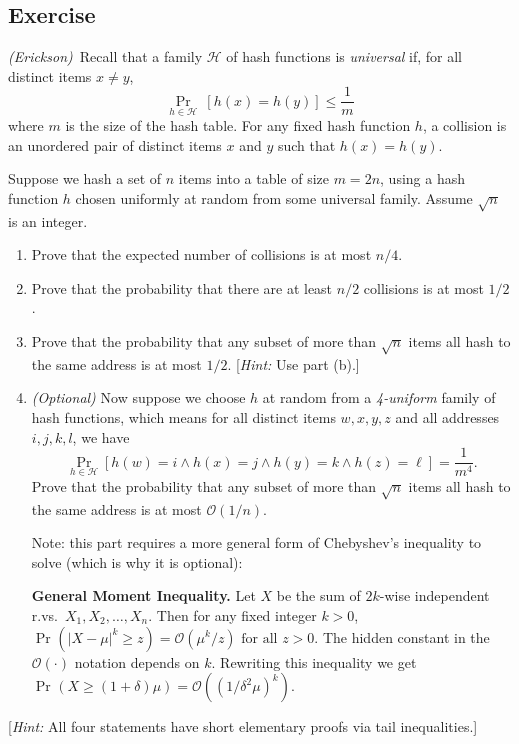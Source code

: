 \documentclass[14pt]{extreport}
\newcounter{counter}
\newcommand{\Exercise}{Exercise \stepcounter{counter}\thecounter}
\DeclareMathOperator*{\oldPr}{Pr}
\renewcommand{\Pr}[2][]{\operatorname{Pr}_{#1}\left(#2\right)}
\begin{document}
\subsection*{\Exercise}
    \textit{(Erickson)}\ Recall that a family \(\mathcal{H}\) of hash functions is \textit{universal} if, for all distinct items \( x \neq y \), $$ \oldPr_{h\in\mathcal{H}}\ [h(x)=h(y)] \leq \frac{1}{m}$$ where \( m \) is the size of the hash table. For any fixed hash function \( h \), a collision is an unordered pair of distinct items \( x \) and \( y \) such that \( h(x)=h(y) \).

    \vspace{3mm}
    Suppose we hash a set of \( n \) items into a table of size \( m = 2n \), using a hash function \( h \) chosen uniformly at random from some universal family. Assume \( \sqrt{n} \) is an integer.
    \begin{enumerate}
        \item Prove that the expected number of collisions is at most \( n/4 \).
        \item  Prove that the probability that there are at least \( n/2 \) collisions is at most \( 1/2 \).
        \item  Prove that the probability that any subset of more than \( \sqrt{n} \) items all hash to the same address is at most \( 1/2 \). [\textit{Hint:} Use part (b).]
        \item \textit{(Optional)} Now suppose we choose \( h \) at random from a \textit{4-uniform} family of hash functions, which means for all distinct items \( w, x, y, z \) and all addresses \( i, j, k, l \), we have \[ \oldPr_{h\in\mathcal{H}}\left[h(w) = i \wedge h(x) = j \wedge h(y) = k \wedge h(z) = \ell\right] = \frac{1}{m^4}. \] Prove that the probability that any subset of more than \( \sqrt{n} \) items all hash to the same address is at most \( \mathcal{O}(1/n) \).

        \vspace{2mm}
        Note: this part requires a more general form of Chebyshev's inequality to solve (which is why it is optional):
        \begin{tcolorbox}
        {\small
            \textbf{General Moment Inequality.} Let $X$ be the sum of \( 2k \)-wise independent r.vs.\ \( X_1, X_2, \ldots, X_n \). Then for any fixed integer \( k > 0 \), \( \Pr{|X - \mu|^k \geq z} = \mathcal{O}\left(\mu^k/z\right) \text{ for all } z > 0. \) The hidden constant in the \( \mathcal{O}(\cdot) \) notation depends on \( k \).
        Rewriting this inequality we get $\Pr{X \ge (1 + \delta) \mu} = \mathcal{O}\left(\left(1/\delta^{2}\mu\right)^{k}\right)$.
        }
        \end{tcolorbox}
    \end{enumerate}
    [\textit{Hint:} All four statements have short elementary proofs via tail inequalities.]
\end{document}
